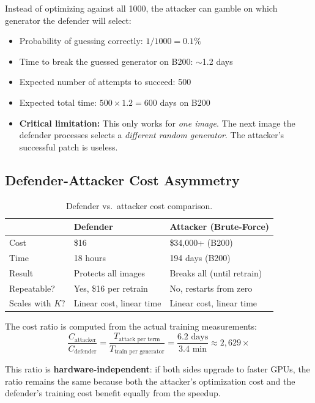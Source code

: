 \documentclass[11pt,a4paper]{article}
\begin{document}
Instead of optimizing against all 1000, the attacker can gamble on which generator the defender will select:
\begin{itemize}[nosep]
    \item Probability of guessing correctly: $1/1000 = 0.1\%$
    \item Time to break the guessed generator on B200: $\sim$1.2 days
    \item Expected number of attempts to succeed: 500
    \item Expected total time: $500 \times 1.2 = 600$ days on B200
    \item \textbf{Critical limitation:} This only works for \textit{one image}. The next image the defender processes selects a \textit{different random generator}. The attacker's successful patch is useless.
\end{itemize}

\subsection{Defender-Attacker Cost Asymmetry}

\begin{table}[H]
\centering
\caption{Defender vs.\ attacker cost comparison.}
\begin{tabular}{lll}
\toprule
& \textbf{Defender} & \textbf{Attacker (Brute-Force)} \\
\midrule
Cost & \$16 & \$34,000+ (B200) \\
Time & 18 hours & 194 days (B200) \\
Result & Protects all images & Breaks all (until retrain) \\
Repeatable? & Yes, \$16 per retrain & No, restarts from zero \\
Scales with $K$? & Linear cost, linear time & Linear cost, linear time \\
\bottomrule
\end{tabular}
\end{table}

The cost ratio is computed from the actual training measurements:
\begin{equation}
    \frac{C_{\text{attacker}}}{C_{\text{defender}}} = \frac{T_{\text{attack per term}}}{T_{\text{train per generator}}} = \frac{6.2 \text{ days}}{3.4 \text{ min}} \approx 2{,}629\times
\end{equation}

This ratio is \textbf{hardware-independent}: if both sides upgrade to faster GPUs, the ratio remains the same because both the attacker's optimization cost and the defender's training cost benefit equally from the speedup.
\end{document}
